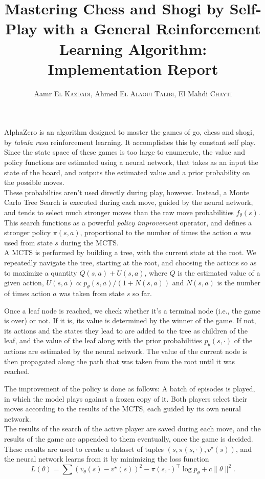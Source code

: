 \documentclass[11pt]{article}
\title{Mastering Chess and Shogi by Self-Play with a General Reinforcement
Learning Algorithm: Implementation Report}
\author{Aamr \textsc{El Kazdadi}, Ahmed \textsc{El Alaoui Talibi}, El Mahdi
\textsc{Chayti}}
\date{}
\begin{document}
\maketitle
AlphaZero is an algorithm designed to master the games of go, chess and shogi,
by \textit{tabula rasa} reinforcement learning. It accomplishes this by constant
self play.\\
Since the state space of these games is too large to enumerate, the value and
policy functions are estimated using a neural network, that takes as an input
the state of the board, and outputs the estimated value and a prior probability
on the possible moves.\\
These probabilties aren't used directly during play, however. Instead, a Monte Carlo
Tree Search is executed during each move, guided by the neural network, and tends
to select much stronger moves than the raw move probabilities $f_\theta(s)$.\\
This search functions as a powerful \textit{policy improvement} operator, and
defines a stronger policy $\pi(s, a)$, proportional to the number of times
the action $a$ was used from state $s$ during the MCTS.\\
A MCTS is performed by building a tree, with the current state at the root.
We repeatedly navigate the tree, starting at the root, and choosing the actions
so as to maximize a quantity $Q(s,a) + U(s,a)$, where $Q$ is the estimated value
of a given action, $U(s,a) \propto p_\theta(s,a)/(1+N(s,a))$ and $N(s,a)$ is the
number of times action $a$ was taken from state $s$ so far.

Once a leaf node is reached, we check whether it's a terminal node (i.e., the
game is over) or not. If it is, its value is determined by the winner of the
game. If not, its actions and the states they lead to are added to the tree as
children of the leaf, and the value of the leaf along with the prior
probabilities $p_\theta(s, \cdot)$ of the actions are estimated by the neural
network. The value of the current node is then propagated along the path that
was taken from the root until it was reached.

The improvement of the policy is done as follows: A batch of episodes is
played, in which the model plays against a frozen copy of it. Both players
select their moves according to the results of the MCTS, each guided by its own
neural network.\\
The results of the search of the active player are saved during each move,
and the results of the game are appended to them eventually, once the game
is decided.\\
These results are used to create a dataset of tuples $(s, \pi(s,\cdot), v^\star(s))$,
and the neural network learns from it by minimizing the loss function
\[
    L(\theta) = \sum (v_\theta(s)-v^\star(s))^2 - \pi(s, \cdot)^\top \log
    p_\theta + c\lVert \theta\rVert^2.
\]
\end{document}
